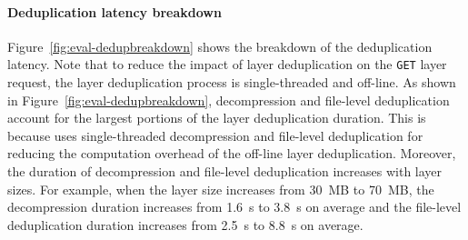 \paragraph{Deduplication latency breakdown}
Figure~\ref{fig:eval-dedupbreakdown} shows the breakdown of the deduplication latency.
Note that to reduce the impact of layer deduplication on the \texttt{GET} layer request, the layer deduplication process is single-threaded and off-line.
As shown in Figure~\ref{fig:eval-dedupbreakdown}, decompression and file-level deduplication account for the largest portions of the layer deduplication duration.
This is because \sysname uses single-threaded decompression and file-level deduplication for reducing the computation overhead of the off-line layer deduplication.
Moreover, the duration of decompression and file-level deduplication increases with layer sizes.
For example, when the layer size increases from 30~MB to 70~MB, 
the decompression duration increases from 1.6~s to 3.8~s on average and the file-level deduplication duration increases from 2.5~s to 8.8~s on average.


